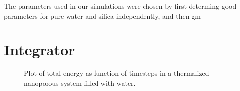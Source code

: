 The parameters used in our simulations were chosen by first determing good parameters for pure water and silica independently, and then gm


\section{Integrator}
%
\begin{figure}[htpb]%
    \centering%
    \caption{Plot of total energy as function of timesteps in a thermalized nanoporous system filled with water.}%
\end{figure}%